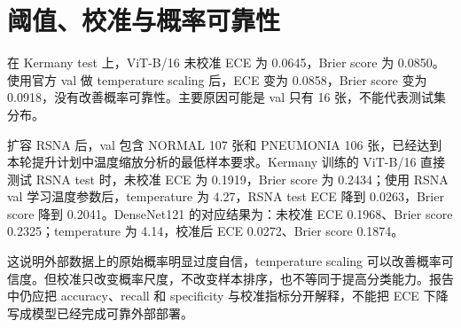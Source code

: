 \chapter{阈值、校准与概率可靠性}

在 Kermany test 上，ViT-B/16 未校准 ECE 为 0.0645，Brier score 为 0.0850。使用官方 val 做 temperature scaling 后，ECE 变为 0.0858，Brier score 变为 0.0918，没有改善概率可靠性。主要原因可能是 val 只有 16 张，不能代表测试集分布。

扩容 RSNA 后，val 包含 NORMAL 107 张和 PNEUMONIA 106 张，已经达到本轮提升计划中温度缩放分析的最低样本要求。Kermany 训练的 ViT-B/16 直接测试 RSNA test 时，未校准 ECE 为 0.1919，Brier score 为 0.2434；使用 RSNA val 学习温度参数后，temperature 为 4.27，RSNA test ECE 降到 0.0263，Brier score 降到 0.2041。DenseNet121 的对应结果为：未校准 ECE 0.1968、Brier score 0.2325；temperature 为 4.14，校准后 ECE 0.0272、Brier score 0.1874。

这说明外部数据上的原始概率明显过度自信，temperature scaling 可以改善概率可信度。但校准只改变概率尺度，不改变样本排序，也不等同于提高分类能力。报告中仍应把 accuracy、recall 和 specificity 与校准指标分开解释，不能把 ECE 下降写成模型已经完成可靠外部部署。
